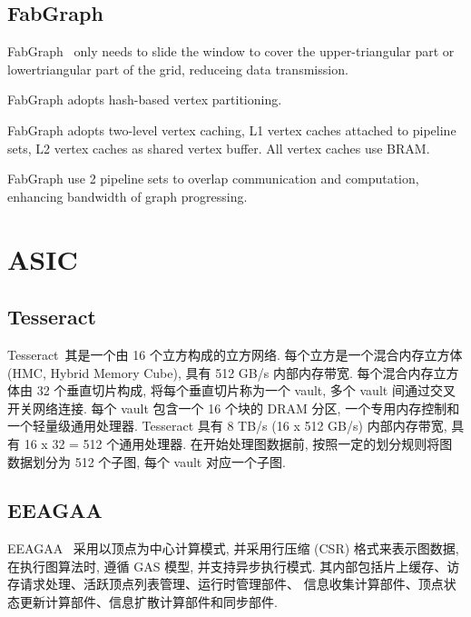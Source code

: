 \documentclass[UTF8,12pt,a4paper]{article}
\begin{document}
\subsection{FabGraph}
FabGraph~\cite{DBLP:conf/fpga/ShaoLHL019}
only needs to slide the window
to cover the upper-triangular part or lowertriangular part of the grid,
reduceing data transmission.

FabGraph adopts hash-based vertex partitioning.

FabGraph adopts two-level vertex caching,
L1 vertex caches attached to pipeline sets,
L2 vertex caches as shared vertex buffer.
All vertex caches use BRAM.

FabGraph use 2 pipeline sets to overlap
communication and computation,
enhancing bandwidth of graph progressing.

\clearpage

\section{ASIC}
\subsection{Tesseract}
Tesseract~\cite{DBLP:conf/isca/AhnHYMC15}其是一个由 16 个立方构成的立方网络.
每个立方是一个混合内存立方体(HMC, Hybrid Memory Cube), 具有 512 GB/s 内部内存带宽.
每个混合内存立方体由 32 个垂直切片构成, 将每个垂直切片称为一个 vault, 多个 vault 间通过交叉开关网络连接.
每个 vault 包含一个 16 个块的 DRAM 分区, 一个专用内存控制和一个轻量级通用处理器.
Tesseract 具有 8 TB/s (16 x 512 GB/s) 内部内存带宽, 具有 16 x 32 = 512 个通用处理器.
在开始处理图数据前, 按照一定的划分规则将图数据划分为 512 个子图, 每个 vault 对应一个子图.

\subsection{EEAGAA}
EEAGAA~\cite{DBLP:conf/isca/OzdalYKAGBO16} 采用以顶点为中心计算模式,
并采用行压缩 (CSR) 格式来表示图数据, 在执行图算法时, 遵循 GAS 模型, 并支持异步执行模式.
其内部包括片上缓存、访存请求处理、活跃顶点列表管理、运行时管理部件、
信息收集计算部件、顶点状态更新计算部件、信息扩散计算部件和同步部件.
\end{document}
